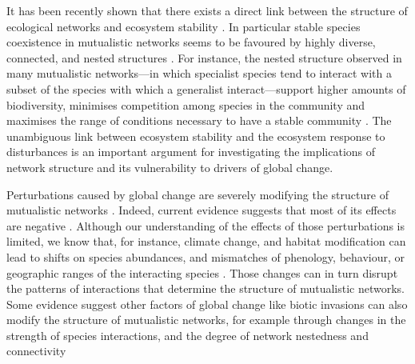 \documentclass[a4paper]{article}
\begin{document}
It has been recently shown that there exists a direct link between the structure of ecological networks and ecosystem stability \autocite{Bascompte2006,Rooney2006,Okuyama2008,Bastolla2009, Tylianakis2010, Thebault2010,Rohr2014,Sauve2014}.
In particular stable species coexistence in mutualistic networks seems to be favoured by highly diverse, connected, and nested structures \autocite{Okuyama2008, Bastolla2009, Thebault2010, Sauve2014}.
For instance, the nested structure observed in many mutualistic networks---in which specialist species tend to interact with a subset of the species with which a generalist interact---support higher amounts of biodiversity, minimises competition among species in the community and maximises the range of conditions necessary to have a stable community \autocite{Bastolla2009, Rohr2014}.
The unambiguous link between ecosystem stability and the ecosystem response to disturbances is an important argument for investigating the implications of network structure and its vulnerability to drivers of global change.

Perturbations caused by global change are severely modifying the structure of mutualistic networks \autocite{Burkle2013a}.
Indeed, current evidence suggests that most of its effects are negative \autocite{Tylianakis2008, Tylianakis2010}.
Although our understanding of the effects of those perturbations is limited, we know that, for instance, climate change, and habitat modification can lead to shifts on species abundances, and mismatches of phenology, behaviour, or geographic ranges of the interacting species \autocite{Memmott2007, Tylianakis2008, Hegland2009, Burkle2013a}.
Those changes can in turn disrupt the patterns of interactions that determine the structure of mutualistic networks.
Some evidence suggest other factors of global change like biotic invasions can also modify the structure of mutualistic networks, for example through changes in the strength of species interactions, and the degree of network nestedness and connectivity \autocite{Olesen2002, Aizen2008, Bartomeus2008, Vila2009, Traveset2013}
\end{document}
